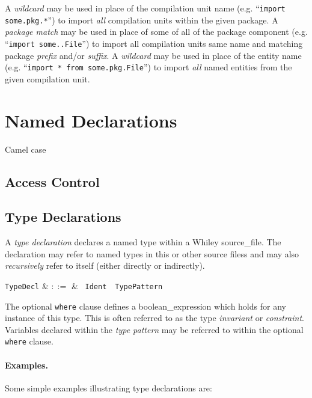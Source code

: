 A {\em wildcard} may be used in place of the compilation unit name (e.g. ``\lstinline{import some.pkg.*}'') to import {\em all} compilation units within the given package.  A {\em package match} may be used in place of some of all of the package component (e.g. ``\lstinline{import some..File}'') to import all compilation units same name and matching package {\em prefix} and/or {\em suffix}.  A {\em wildcard} may be used in place of the entity name (e.g. ``\lstinline{import * from some.pkg.File}'') to import {\em all} named entities from the given compilation unit.  

\section{Named Declarations}

Camel case

\subsection{Access Control}


\subsection{Type Declarations}
\label{c_source_files_type_decl}

A {\em type declaration} declares a named type within a Whiley
\gls{source_file}.  The declaration may refer to named types in this
or other source filess and may also {\em recursively}
refer to itself (either directly or indirectly).

\begin{syntax}
  \verb+TypeDecl+ & $::=$ & \ \verb+Ident+\ \
  \verb+TypePattern+\ \\
\end{syntax}

The optional \lstinline{where} clause defines a
\gls{boolean_expression} which holds for any instance of this type.
This is often referred to as the type {\em invariant} or {\em
  constraint}.  Variables declared within the {\em type pattern} may be
referred to within the optional \lstinline{where} clause.

\paragraph{Examples.}  Some simple examples illustrating type
declarations are:

